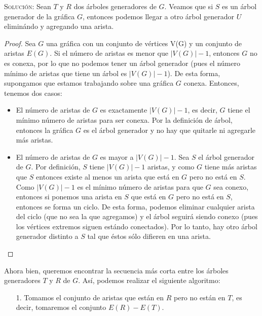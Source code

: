 \documentclass[letterpaper,11pt]{article}
\begin{document}
\begin{enumerate}
    \textsc{Solución:} Sean $T$ y $R$ dos árboles generadores de $G$. Veamos 
    que si $S$ es un árbol generador de la gráfica $G$, entonces podemos 
    llegar a otro árbol generador $U$ eliminándo y agregando una arista. 
    \begin{proof}
        Sea $G$ una gráfica con un conjunto de vértices V(G) y un conjunto
        de aristas $E(G)$. Si el número de aristas es menor que $|V(G)| - 1$, 
        entonces $G$ no es conexa, por lo que no podemos tener un árbol 
        generador (pues el número mínimo de aristas que tiene un árbol es 
        $|V(G)|-1$). De esta forma, supongamos que estamos trabajando sobre 
        una gráfica $G$ conexa. Entonces, tenemos dos casos:
        \begin{itemize}
            \item El número de aristas de $G$ es exactamente $|V(G)|-1$, es 
            decir, $G$ tiene el mínimo número de aristas para ser conexa.
            Por la definición de árbol, entonces la gráfica $G$ es el 
            árbol generador y no hay que quitarle ni agregarle más aristas.

            \item El número de aristas de $G$ es mayor a $|V(G)|-1$. Sea 
            $S$ el árbol generador de $G$. Por definición, $S$ tiene $|V(G)|-1$
            aristas, y como $G$ tiene más aristas que $S$ entonces existe al 
            menos un arista que está en $G$ pero no está en $S$. Como 
            $|V(G)|-1$ es el mínimo número de aristas para que $G$ sea conexo, 
            entonces si ponemos una arista en $S$ que está en $G$ pero no 
            está en $S$, entonces se forma un ciclo. De esta forma, podemos 
            eliminar cualquier arista del ciclo (que no sea la que agregamos)
            y el árbol seguirá siendo conexo (pues los vértices extremos 
            siguen estándo conectados). Por lo tanto, hay otro árbol generador 
            distinto a $S$ tal que éstos sólo difieren en una arista. 
        \end{itemize}
    \end{proof}

    Ahora bien, queremos encontrar la secuencia más corta entre los árboles 
    generadores $T$ y $R$ de $G$. Así, podemos realizar el siguiente 
    algoritmo:
    \begin{itemize}
        \item[1.] Tomamos el conjunto de aristas que están en $R$ pero no están 
        en $T$, es decir, tomaremos el conjunto $E(R) - E(T)$.


\end{itemize}
\end{enumerate}
\end{document}

